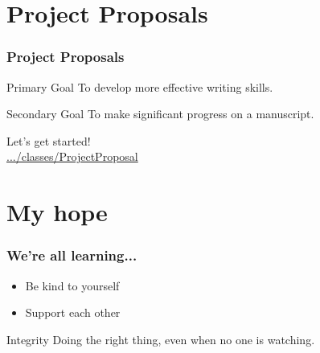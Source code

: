 \documentclass{beamer}
\begin{document}

\section{Project Proposals}


\begin{frame}
    \frametitle{Project Proposals}

    \begin{block}{Primary Goal}
        To develop more effective writing skills.
    \end{block}

    \begin{block}{Secondary Goal}
        To make significant progress on a manuscript.
    \end{block}

Let's get started!\\
        \href{https://github.com/ScientificWriting/tree/master/classes/ProjectProposal}{.../classes/ProjectProposal}


\end{frame}


\section{My hope}


\begin{frame}
    \frametitle{We're all learning...}


    \begin{itemize}
        \item Be kind to yourself
        \item Support each other
    \end{itemize}

	\bigskip

    \begin{block}{Integrity}
      Doing the right thing, even when no one is watching.
    \end{block}

\end{frame}
\end{document}
